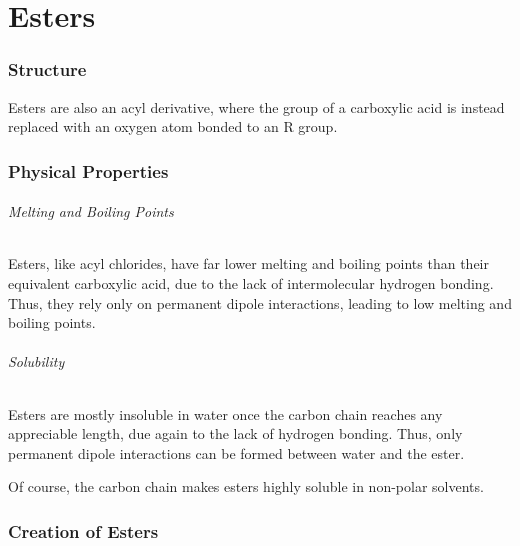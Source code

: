 

\pagebreak
\hypertarget{ChapterEsters}{}
\part{Esters}

	\section{Structure}

		Esters are also an acyl derivative, where the  group of a carboxylic acid is instead replaced with an oxygen atom
		bonded to an R group.





	\section{Physical Properties}

		\paragraph{Melting and Boiling Points}

		Esters, like acyl chlorides, have far lower melting and boiling points than their equivalent carboxylic acid, due to the lack of
		intermolecular hydrogen bonding. Thus, they rely only on permanent dipole interactions, leading to low melting and boiling points.


		\paragraph{Solubility}

		Esters are mostly insoluble in water once the carbon chain reaches any appreciable length, due again to the lack of hydrogen bonding.
		Thus, only permanent dipole interactions can be formed between water and the ester.

		Of course, the carbon chain makes esters highly soluble in non-polar solvents.



	\pagebreak
	\section{Creation of Esters}

